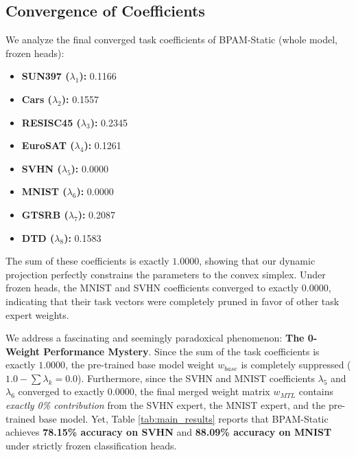 \subsection{Convergence of Coefficients}
We analyze the final converged task coefficients of BPAM-Static (whole model, frozen heads):
\begin{itemize}
    \item {\bf SUN397 ($\lambda_1$):} 0.1166
    \item {\bf Cars ($\lambda_2$):} 0.1557
    \item {\bf RESISC45 ($\lambda_3$):} 0.2345
    \item {\bf EuroSAT ($\lambda_4$):} 0.1261
    \item {\bf SVHN ($\lambda_5$):} 0.0000
    \item {\bf MNIST ($\lambda_6$):} 0.0000
    \item {\bf GTSRB ($\lambda_7$):} 0.2087
    \item {\bf DTD ($\lambda_8$):} 0.1583
\end{itemize}
The sum of these coefficients is exactly $1.0000$, showing that our dynamic projection perfectly constrains the parameters to the convex simplex. Under frozen heads, the MNIST and SVHN coefficients converged to exactly $0.0000$, indicating that their task vectors were completely pruned in favor of other task expert weights. 

We address a fascinating and seemingly paradoxical phenomenon: {\bf The 0-Weight Performance Mystery}. Since the sum of the task coefficients is exactly $1.0000$, the pre-trained base model weight $w_{base}$ is completely suppressed ($1.0 - \sum \lambda_k = 0.0$). Furthermore, since the SVHN and MNIST coefficients $\lambda_5$ and $\lambda_6$ converged to exactly $0.0000$, the final merged weight matrix $w_{MTL}$ contains {\it exactly 0\% contribution} from the SVHN expert, the MNIST expert, and the pre-trained base model. Yet, Table \ref{tab:main_results} reports that BPAM-Static achieves {\bf 78.15\% accuracy on SVHN} and {\bf 88.09\% accuracy on MNIST} under strictly frozen classification heads. 

